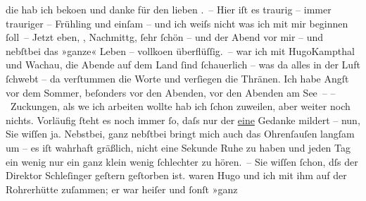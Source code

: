 \begin{ledgroupsized}[t]{13cm}
           \pstart
           die \label{K_L00921-1v}\label{K_L00921-1h} hab ich beko{\geminationm}en und danke für den
               lieben \label{K_L00921-2v}\label{K_L00921-2h}. – Hier iſt es traurig – immer trauriger – Frühling und einſam – und
               ich weiſs nicht was ich mit mir beginnen ſoll –\pend
           \pstart
           Jetzt eben, \label{K_L00921-3v}\label{K_L00921-3h}, Nachmittg, ſehr ſchön
               – und der Abend vor mir – und nebſtbei das »ganze« Leben – vollko{\geminationm}en {\pb}überflüſſig. –\pend
           \pstart
           \label{K_L00921-4v}\label{K_L00921-4h} war ich mit HugoKampthal und Wachau, die Abende auf dem Land ſind ſchauerlich – was da alles in der Luft
               ſchwebt – da verſtummen die Worte und verſiegen die Thränen. Ich habe Angſt vor dem
               Sommer, beſonders vor den Abenden, vor den Abenden am See –\pend
           \pstart
           – Zuckungen, als we{\geminationn} ich {\pb}arbeiten wollte hab ich ſchon zuweilen, aber weiter noch nichts. Vorläufig ſteht es
               noch immer ſo, daſs nur der \uline{eine} Gedanke mildert –
               nun, Sie wiſſen ja.\pend
           \pstart
           Nebstbei, ganz nebſtbei bringt mich auch das Ohrenſauſen langſam um – es iſt wahrhaft
               gräßlich, nicht eine Sekunde Ruhe zu haben und jeden Tag ein wenig nur {\pb}ein ganz klein wenig ſchlechter zu hören. –\pend
           \pstart
           Sie wiſſen ſchon, dſs der Direktor Schleſinger
               geſtern geſtorben ist. \label{K_L00921-5v}\label{K_L00921-5h} waren Hugo und ich mit ihm auf der Rohrerhütte zuſammen; er war heiſer und ſonſt »ganz

\end{ledgroupsized}
